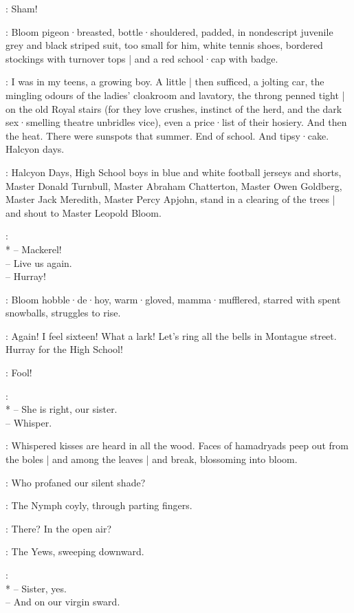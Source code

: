 \Echo:
Sham!

:
Bloom pigeon·breasted,
bottle·shouldered,
padded,
in nondescript juvenile grey and black striped suit,
too small for him,
white tennis shoes,
bordered stockings with turnover tops |
and a red school·cap with badge.

\Bloom:
I was in my teens,
a growing boy.
A little |
then sufficed,
a jolting car,
the mingling odours of the ladies' cloakroom and lavatory,
%
the throng penned tight |
on the old Royal stairs
(for they love crushes,
instinct of the herd,
and the dark sex·smelling theatre unbridles vice),
even a price·list of their hosiery.
And then the heat.
There were sunspots that summer.
End of school.
And tipsy·cake.
Halcyon days.

:
Halcyon Days,
High School boys in blue and white football jerseys and shorts,
Master Donald Turnbull,
Master Abraham Chatterton,
Master Owen Goldberg,
Master Jack Meredith,
Master Percy Apjohn,
stand in a clearing of the trees |
and shout to Master Leopold Bloom.

\HalcyonDays:
\\*
-- Mackerel!\\
-- Live us again.\\
-- Hurray!\\

:
Bloom hobble·de·hoy,
warm·gloved,
mamma·mufflered,
starred with spent snowballs,
struggles to rise.

\Bloom:
Again!
I feel sixteen!
What a lark!
Let's ring all the bells in Montague street.
Hurray for the High School!

\Echo:
Fool!

\Yews:
\\*
-- She is right, our sister.\\
-- Whisper.%

:
Whispered kisses are heard in all the wood.
Faces of hamadryads peep out from the boles |
and among the leaves |
and break,
blossoming into bloom.

\Yews:
Who profaned our silent shade?

:
The Nymph coyly,
through parting fingers.

\Nymph:
There?
In the open air?

:
The Yews,
sweeping downward.

\Yews:\\*
-- Sister, yes.\\
-- And on our virgin sward.

